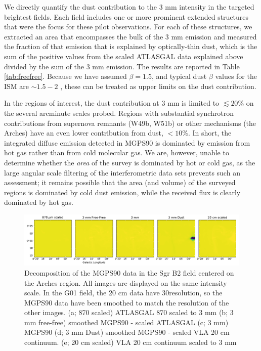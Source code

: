 \documentclass[twocolumn]{aastex62}
\begin{document}
We directly quantify the dust contribution to the 3 mm intensity in the
targeted brightest fields.  Each field includes one or more prominent extended
structures that were the focus for these pilot observations.  For each of these
structures, we extracted an area that encompasses the bulk of the 3 mm emission
and measured the fraction of that emission that is explained by optically-thin
dust, which is the sum of the positive values from the scaled ATLASGAL data
explained above divided by the sum of the 3 mm emission.  The results are reported
in Table \ref{tab:freefree}.  Because we have assumed $\beta=1.5$, and typical
dust $\beta$ values for the ISM are $\sim1.5-2$ \citep[e.g.,][]{Ossenkopf1994a},
these can be treated as upper limits on the dust contribution.

In the regions of interest, the dust contribution at 3 mm is limited to
$\lesssim20\%$ on the several arcminute scales probed.  Regions with substantial
synchrotron contributions from supernova remnants (W49b, W51b) or other mechanisms
(the Arches) have an even lower contribution from dust, $<10\%$.  In short, the 
integrated diffuse emission detected in MGPS90 is dominated by emission from hot gas rather
than from cold molecular gas.  We are, however, unable to determine whether the \emph{area}
of the survey is dominated by hot or cold gas, as the large angular scale filtering of the
interferometric data sets prevents such an assessment; it remains possible that the area
(and volume) of the surveyed regions is dominated by cold dust emission, while the received
flux is clearly dominated by hot gas.






\begin{figure}[htp]
    \includegraphics[width=17cm]{figures/G01_arches_5panel.pdf}
    \caption{Decomposition of the MGPS90 data in the Sgr B2 field centered on the Arches region. 
    All images are displayed on the same intensity scale.  In the G01 field,
    the 20 cm data have 30\arcsec resolution, so the MGPS90 data have been smoothed to match
    the resolution of the other images.
    (a; 870 \um scaled) ATLASGAL 870 \um scaled to 3 mm
    (b; 3 mm free-free) smoothed MGPS90 - scaled ATLASGAL
    (c; 3 mm) MGPS90 
    (d; 3 mm Dust) smoothed MGPS90 - scaled VLA 20 cm continuum.
    (e; 20 cm scaled) VLA 20 cm continuum scaled to 3 mm
}
\label{fig:arches_freefree}
\end{figure}
\end{document}
